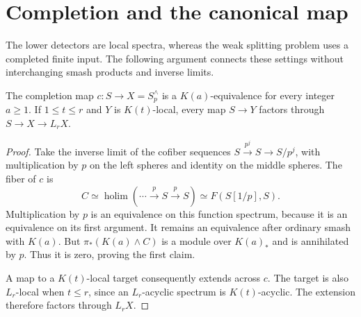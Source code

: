 \section{Completion and the canonical map}\label{sec:completion}
The lower detectors are local spectra, whereas the weak splitting problem
uses a completed finite input. The following argument connects these
settings without interchanging smash products and inverse limits.

\begin{lemma}\label{lem:completion}
The completion map $c:S\to X=S_p^\wedge$ is a $K(a)$-equivalence for
every integer $a\geq1$. If $1\leq t\leq r$ and $Y$ is $K(t)$-local,
every map $S\to Y$ factors through $S\to X\to L_rX$.
\end{lemma}
\begin{proof}
Take the inverse limit of the cofiber sequences
$S\xrightarrow{p^j}S\to S/p^j$, with multiplication by $p$ on the
left spheres and identity on the middle spheres. The fiber of $c$ is
\[
 C\simeq\operatorname{holim}(\cdots\xrightarrow pS\xrightarrow pS)
   \simeq F(S[1/p],S).
\]
Multiplication by $p$ is an equivalence on this function spectrum,
because it is an equivalence on its first argument. It remains an
equivalence after ordinary smash with $K(a)$. But
$\pi_*(K(a)\wedge C)$ is a module over $K(a)_*$ and is annihilated
by $p$. Thus it is zero, proving the first claim.

A map to a $K(t)$-local target consequently extends across $c$.
The target is also $L_r$-local when $t\leq r$, since an $L_r$-acyclic
spectrum is $K(t)$-acyclic. The extension therefore factors through
$L_rX$.
\end{proof}

